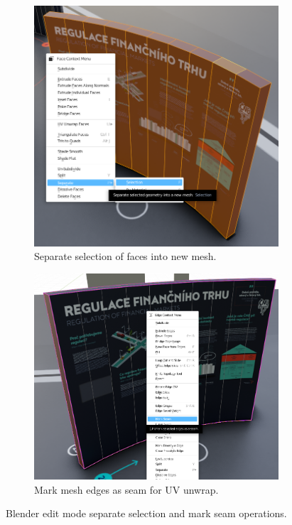 \begin{figure}[!b]\centering
    \begin{subfigure}[b]{0.47\textwidth}
        \centering
        \includegraphics[width=\textwidth]{img/blender-separate-selection.png}
        \caption{Separate selection of faces into new mesh.}
        \label{fig:blender-separate-selection}
    \end{subfigure}
    \hfill
    \begin{subfigure}[b]{0.52\textwidth}
        \centering
        \includegraphics[width=\textwidth]{img/blender-mark-seam.png}
        \caption{Mark mesh edges as seam for UV unwrap.}
        \label{fig:blender-mark-seam}
    \end{subfigure}
    \caption{Blender edit mode separate selection and mark seam operations.}
\end{figure}

